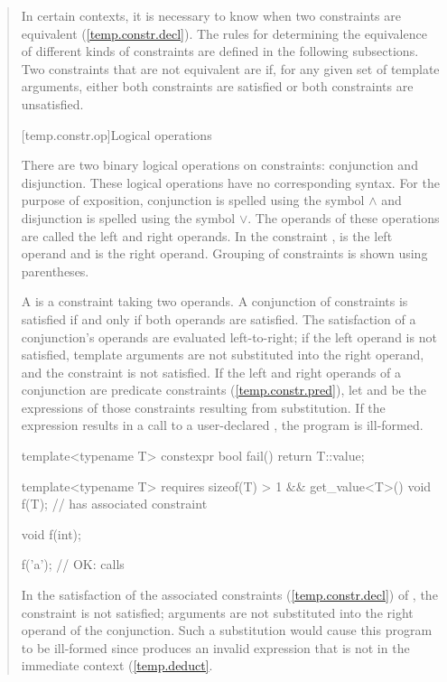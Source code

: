 \begin{quote}
\pnum 
In certain contexts, it is necessary to know when two constraints are equivalent
(\ref{temp.constr.decl}). 
% 
The rules for determining the equivalence of different kinds of
constraints are defined in the following subsections.
% 
Two constraints that are not equivalent are  if,
for any given set of template arguments, either both constraints are satisfied
or both constraints are unsatisfied.


[temp.constr.op]{Logical operations}

\pnum
There are two binary logical operations on constraints: conjunction
and disjunction.
% 
\enternote 
These logical operations have no corresponding \Cpp syntax.
For the purpose of exposition, conjunction is spelled
using the symbol $\land$ and disjunction is spelled using the 
symbol $\lor$. 
% 
The operands of these operations are called the left 
and right operands. In the constraint ,
 is the left operand and  is the right operand.
% 
Grouping of constraints is shown using parentheses.
\exitnote

\pnum
A  is a constraint taking two 
operands. A conjunction of constraints is satisfied if and only 
if both operands are satisfied. 
% 
The satisfaction of a conjunction's operands are evaluated left-to-right; 
if the left operand is not satisfied, template arguments are not 
substituted into the right operand, and the constraint is not satisfied.
% 
If the left and right operands of a conjunction are predicate constraints
(\ref{temp.constr.pred}), let  and  be the expressions
of those constraints resulting from substitution. If the expression
 results in a call to a user-declared ,
the program is ill-formed.
% 
\enterexample
\begin{codeblock}
template<typename T>
  constexpr bool fail() { return T::value; }

template<typename T>
  requires sizeof(T) > 1 && get_value<T>()
    void f(T);   // has associated constraint 

void f(int);

f('a'); // OK: calls 
\end{codeblock}
In the satisfaction of the associated constraints (\ref{temp.constr.decl}) 
of , the constraint  is not satisfied; 
arguments are not substituted into the right operand of the conjunction.
% 
Such a substitution would cause this program to be ill-formed since 
 produces an invalid expression that is not in
the immediate context (\ref{temp.deduct}.
\exitexample



\end{quote}
